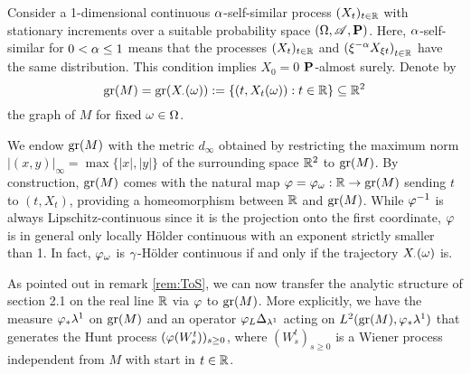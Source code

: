 Consider a 1-dimensional continuous $\alpha$-self-similar process 
$(X_t)_{t\in\mathbb{R}}$ with stationary increments over a suitable probability space $(\Omega,\mathscr{A},\mathbf{P})$. Here, $\alpha$-self-similar for 
$0<\alpha\leq1$ means that the processes $(X_t)_{t\in\mathbb{R}}$ and 
$\left(\xi^{-\alpha}X_{\xi t}\right)_{t\in\mathbb{R}}$ have the same distribution. This condition implies $X_0=0$ $\mathbf{P}$-almost surely. Denote by
\[
 \operatorname{gr}(M)=\operatorname{gr}(X_\cdot(\omega)):=\left\{(t,X_t(\omega)):t\in\mathbb{R} \right\}
     \subseteq \mathbb{R}^2
\]
the graph of $M$ for fixed $\omega\in\Omega$. 

We endow $\operatorname{gr}(M)$ with the metric $d_\infty$ obtained by restricting the maximum norm $|(x,y)|_\infty=\max\{|x|,|y|\}$ of the surrounding space $\mathbb{R}^2$ to $\operatorname{gr}(M)$. By construction, $\operatorname{gr}(M)$ comes with the natural map $\varphi=\varphi_\omega:\mathbb{R}\to\operatorname{gr}(M)$ sending $t$ to 
$(t,X_t)$, providing a homeomorphism between $\mathbb{R}$ and $\operatorname{gr}(M)$. 
While $\varphi^{-1}$ is always Lipschitz-continuous since it is the projection onto the first coordinate, $\varphi$ is in general only locally H\"older continuous with an exponent strictly smaller than 1. In fact, $\varphi_\omega$ is $\gamma$-H\"older continuous if and only if the trajectory $X_\cdot(\omega)$ is.

As pointed out in remark \ref{rem:ToS}, we can now transfer the analytic structure of section 2.1 on the real line $\mathbb{R}$ via $\varphi$ to 
$\operatorname{gr}(M)$. More explicitly, we have the measure $\varphi_*\lambda^1$ on $\operatorname{gr}(M)$ and an operator $\varphi_L\Delta_{\lambda^1}$ acting on $L^2(\operatorname{gr}(M),\varphi_*\lambda^1)$ that generates the Hunt process $(\varphi(W_s^t))_{s\geq0}$, where 
$(W_s^t)_{s\geq0}$ is a Wiener process independent from $M$ with start in $t\in\mathbb{R}$.

